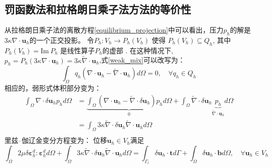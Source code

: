\subsection{罚函数法和拉格朗日乘子法方法的等价性}
从拉格朗日乘子法的离散方程\eqref{equilibrium_projection}中可以看出，压力$p_h$的解是$3\kappa \nabla \cdot \boldsymbol u_h$的一个正交投影。
令$P_h: V_h \rightarrow P_h(V_h)$ 使得 $P_h(V_h) \subseteq Q_h$, 其中 $P_h(V_h) = \textrm{Im}\:P_h$ 是线性算子$P_h$的虚部 \cite{philippeg.2013}. 
在这种情况下, $p_h = P_h (3\kappa \nabla \cdot \boldsymbol u_h) = 3\kappa \tilde \nabla \cdot \boldsymbol u_h$,式\eqref{weak_mix}可以改写为：
\begin{equation}
    \int_\Omega q_h(\nabla \cdot \boldsymbol u_h - \tilde \nabla \cdot \boldsymbol u_h) d\Omega = 0, \quad \forall q_h \in Q_h
\end{equation}
相应的，弱形式体积部分变为：
\begin{equation}\label{projection_mixed}
    \begin{split}
        \int_\Omega \nabla \cdot \delta \boldsymbol u_h p_h d\Omega &= \underbrace{\int_\Omega (\nabla \cdot \boldsymbol u_h - \tilde \nabla \cdot \delta \boldsymbol u_h) p_h d\Omega}_0 + \int_\Omega \tilde \nabla \cdot \delta \boldsymbol u_h \underbrace{p_h}_{\tilde \nabla \cdot \boldsymbol u_h} d\Omega \\
        &= \int_\Omega 3\kappa \tilde \nabla \cdot \delta \boldsymbol u_h \tilde \nabla \cdot \boldsymbol u_h d\Omega \\
    \end{split}
\end{equation}
里兹--伽辽金变分方程变为：
位移$\boldsymbol u_h \in V_h$满足
\begin{equation}
    \int_\Omega 2\mu \delta \boldsymbol \varepsilon^d_h : \boldsymbol \varepsilon^d_h d\Omega +
    \int_\Omega 3\kappa \tilde \nabla \cdot \delta \boldsymbol u_h \tilde \nabla \cdot \boldsymbol u_h d\Omega =
    \int_{\Gamma_t} \delta \boldsymbol u_h \cdot \boldsymbol t d\Gamma + \int_\Omega \delta \boldsymbol u_h \cdot \boldsymbol b d\Omega, \quad \forall \boldsymbol u_h \in V_h
\end{equation}

